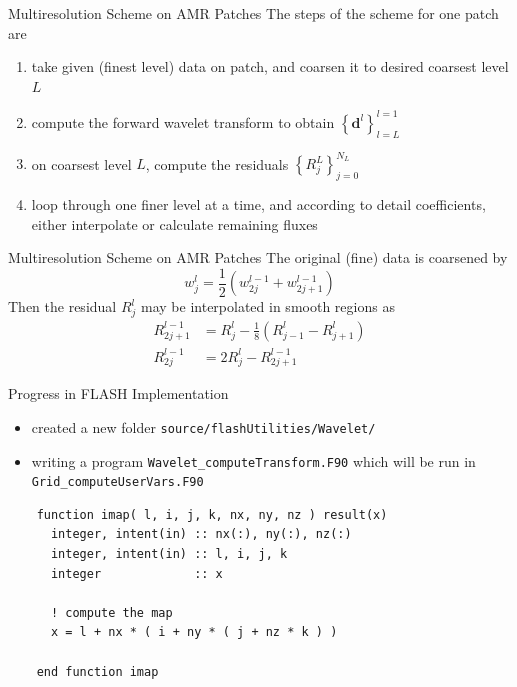 \documentclass{beamer}
\begin{document}
\begin{frame}{Multiresolution Scheme on AMR Patches}
      The steps of the scheme for one patch are
      \begin{enumerate}
        \item take given (finest level) data on patch, and coarsen it to desired coarsest level $L$
        \item compute the forward wavelet transform to obtain $\left\{ \mathbf{d}^{l}\right\}_{l=L}^{l=1}$
        \item on coarsest level $L$, compute the residuals $\left\{ R_{j}^{L} \right\}_{j=0}^{N_{L}}$
        \item loop through one finer level at a time, and according to detail coefficients,
              either interpolate or calculate remaining fluxes
      \end{enumerate}
\end{frame}

\begin{frame}{Multiresolution Scheme on AMR Patches}
  The original (fine) data is coarsened by
      \begin{equation*}
        w_{j}^{l} = \frac{1}{2} \left( w_{2j}^{l-1} + w_{2j+1}^{l-1} \right)
      \end{equation*}
      Then the residual $R_{j}^{l}$ may be interpolated in smooth regions as
      \begin{align*}
        R^{l-1}_{2j+1} & = R^{l}_{j} - \frac{1}{8} \left( R^{l}_{j-1} - R^{l}_{j+1} \right) \\
        R^{l-1}_{2j} & = 2 R^{l}_{j} - R^{l-1}_{2j+1}
      \end{align*}
\end{frame}

\begin{frame}[fragile]{Progress in FLASH Implementation}
  \begin{itemize}
    \setlength\itemsep{1em}
    \item created a new folder \texttt{source/flashUtilities/Wavelet/}
    \item writing a program \texttt{Wavelet\_computeTransform.F90} which will be run 
          in \texttt{Grid\_computeUserVars.F90}
  \end{itemize}
  \begin{verbatim}
    function imap( l, i, j, k, nx, ny, nz ) result(x)
      integer, intent(in) :: nx(:), ny(:), nz(:)
      integer, intent(in) :: l, i, j, k
      integer             :: x

      ! compute the map
      x = l + nx * ( i + ny * ( j + nz * k ) )

    end function imap
  \end{verbatim}
\end{frame}
\end{document}
